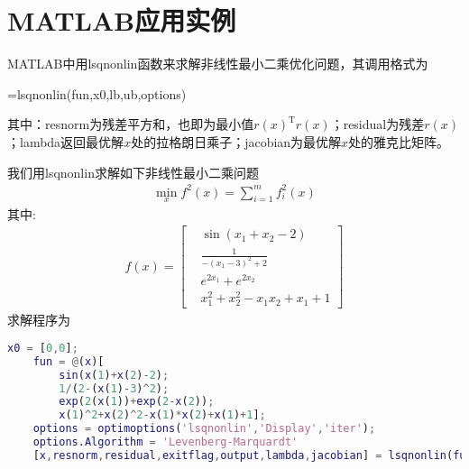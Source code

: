 \section{MATLAB应用实例}
    \par
    MATLAB中用lsqnonlin函数来求解非线性最小二乘优化问题，其调用格式为
    \par
    [x,resnorm,residual,exitflag,output,lambda,jacobian]=lsqnonlin(fun,x0,lb,ub,options)
    \par
    其中：resnorm为残差平方和，也即为最小值$r(x)^\mathrm{T} r(x)$；residual为残差$r(x)$；lambda返回最优解$x$处的拉格朗日乘子；jacobian为最优解$x$处的雅克比矩阵。
    \par
    我们用lsqnonlin求解如下非线性最小二乘问题
    \begin{align*}
    \mathop {\min}\limits_x f^2(x)=\mathop {\sum}\limits_{i=1}^m f_i^2(x)
    \end{align*}
    其中:
    \begin{align*}
    f(x)=\left[
    \begin{aligned}
    &\sin(x_1+x_2-2)\\
    &\frac {1}{-(x_1-3)^2+2}\\
    &e^{2x_1}+e^{2x_2}\\
    &x_1^2+x_2^2-x_1x_2+x_1+1
    \end{aligned}
    \right]
    \end{align*}
    求解程序为
    \begin{lstlisting}[language=Matlab]
    x0 = [0,0];
    fun = @(x)[
        sin(x(1)+x(2)-2);
        1/(2-(x(1)-3)^2);
        exp(2(x(1))+exp(2-x(2));
        x(1)^2+x(2)^2-x(1)*x(2)+x(1)+1];
    options = optimoptions('lsqnonlin','Display','iter');
    options.Algorithm = 'Levenberg-Marquardt'
    [x,resnorm,residual,exitflag,output,lambda,jacobian] = lsqnonlin(fun,x0,IJ,IJ,options)
    \end{lstlisting}


